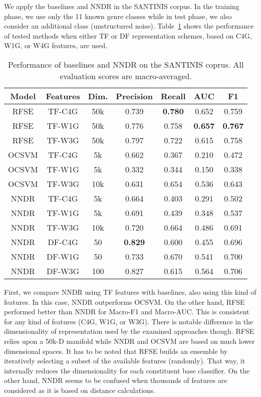 We apply the baselines and NNDR in the SANTINIS corpus. In the training phase, we use only the 11 known genre classes while in test phase, we also consider an additional class (unstructured noise). Table~\ref{tbl:results} shows the performance of tested methods when either TF or DF representation schemes, based on C4G, W1G, or W4G features, are used. 

\begin{table}[t]
\center
\caption {Performance of baselines and NNDR on the SANTINIS coprus. All evaluation scores are macro-averaged.}
\label{tbl:results}
\begin{tabular}{ccccccc}
\hline
Model & Features & Dim. & Precision & Recall & AUC & F1 \\
\hline
RFSE & TF-C4G & 50k & 0.739 & \textbf{0.780} & 0.652 & 0.759 \\
RFSE & TF-W1G & 50k & 0.776 & 0.758 & \textbf{0.657} & \textbf{0.767} \\
RFSE & TF-W3G & 50k & 0.797 & 0.722 & 0.615 & 0.758 \\
OCSVM & TF-C4G & 5k & 0.662 & 0.367 & 0.210 & 0.472\\
OCSVM & TF-W1G & 5k & 0.332 & 0.344 & 0.150 & 0.338\\
OCSVM & TF-W3G & 10k & 0.631 & 0.654 & 0.536 & 0.643\\
NNDR & TF-C4G & 5k & 0.664 & 0.403 & 0.291 & 0.502 \\
NNDR & TF-W1G & 5k & 0.691 & 0.439 & 0.348 & 0.537 \\
NNDR & TF-W3G & 10k & 0.720 & 0.664 & 0.486 & 0.691 \\
NNDR & DF-C4G & 50 & \textbf{0.829} & 0.600 & 0.455 & 0.696 \\
NNDR & DF-W1G & 50 & 0.733 & 0.670 & 0.541 & 0.700 \\
NNDR & DF-W3G & 100 & 0.827 & 0.615 & 0.564 & 0.706 \\
\hline
\end{tabular}
\end{table}

First, we compare NNDR using TF features with baselines, also using this kind of features. In this case, NNDR outperforms OCSVM. On the other hand, RFSE performed better than NNDR for Macro-F1 and Macro-AUC. This is consistent for any kind of features (C4G, W1G, or W3G). There is notable difference in the dimensionality of representation used by the examined approaches though. RFSE relies upon a 50k-D manifold while NNDR and OCSVM are based on much lower dimensional spaces. It has to be noted that RFSE builds an ensemble by iteratively selecting a subset of the available features (randomly). That way, it internally reduces the dimensionality for each constituent base classifier. On the other hand, NNDR seems to be confused when thousands of features are considered as it is based on distance calculations. 

